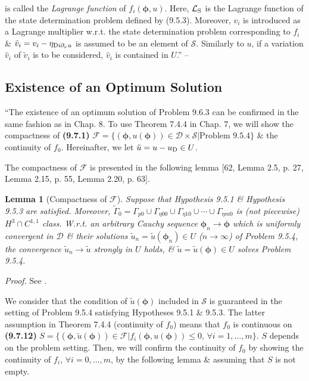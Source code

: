 \documentclass[oneside]{book}
\numberwithin{equation}{section}
\newtheorem{lemma}{Lemma}[chapter]
\begin{document}
is called the \textit{Lagrange function} of $f_i(\boldsymbol{\phi},u)$. Here, $\mathcal{L}_{\rm S}$ is the Lagrange function of the state determination problem defined by (9.5.3). Moreover, $v_i$ is introduced as a Lagrange multiplier w.r.t. the state determination problem corresponding to $f_i$ \& $\tilde{v}_i = v_i - \eta_{{\rm D}i\partial_\nu u}$ is assumed to be an element of $\mathcal{S}$. Similarly to $u$, if a variation $\hat{v}_i$ of $\tilde{v}_i$ is to be considered, $\hat{v}_i$ is contained in $U$.'' -- \cite[pp. 467--469]{Azegami2020}

\subsection{Existence of an Optimum Solution}
``The existence of an optimum solution of Problem 9.6.3 can be confirmed in the same fashion as in Chap. 8. To use Theorem 7.4.4 in Chap. 7, we will show the compactness of \textbf{(9.7.1)} $\mathcal{F} = \{(\boldsymbol{\phi},u(\boldsymbol{\phi}))\in\mathcal{D}\times\mathcal{S}|\mbox{Problem 9.5.4}\}$ \& the continuity of $f_0$. Hereinafter, we let $\tilde{u} = u - u_{\rm D}\in U$.

The compactness of $\mathcal{F}$ is presented in the following lemma [62, Lemma 2.5, p. 27, Lemma 2.15, p. 55, Lemma 2.20, p. 63].

\begin{lemma}[Compactness of $\mathcal{F}$]
	Suppose that Hypothesis 9.5.1 \& Hypothesis 9.5.3 are satisfied. Moreover, $\tilde{\Gamma}_0 = \Gamma_{p0}\cup\Gamma_{\eta00}\cup\Gamma_{\eta10}\cup\cdots\cup\Gamma_{\eta m0}$ is (not piecewise) $H^3\cap C^{1,1}$ class. W.r.t. an arbitrary Cauchy sequence $\boldsymbol{\phi}_n\to\boldsymbol{\phi}$ which is uniformly convergent in $\mathcal{D}$ \& their solutions $\tilde{u}_n = \tilde{u}(\boldsymbol{\phi}_n)\in U$ ($n\to\infty$) of Problem 9.5.4, the convergence $\tilde{u}_n\to\tilde{u}$ strongly in $U$ holds, \& $\tilde{u} = \tilde{u}(\boldsymbol{\phi})\in U$ solves Problem 9.5.4.
\end{lemma}
\textit{Proof.} See \cite[pp. 470--474]{Azegami2020}.

We consider that the condition of $\tilde{u}(\boldsymbol{\phi})$ included in $\mathcal{S}$ is guaranteed in the setting of Problem 9.5.4 satisfying Hypotheses 9.5.1 \& 9.5.3. The latter assumption in Theorem 7.4.4 (continuity of $f_0$) means that $f_0$ is continuous on \textbf{(9.7.12)} $S = \{(\boldsymbol{\phi},\tilde{u}(\boldsymbol{\phi}))\in\mathcal{F}|f_i(\boldsymbol{\phi},u(\boldsymbol{\phi}))\le 0,\,\forall i = 1,\ldots,m\}$. $S$ depends on the problem setting. Then, we will confirm the continuity of $f_0$ by showing the continuity of $f_i$, $\forall i = 0,\ldots,m$, by the following lemma \& assuming that $S$ is not empty.
\end{document}
